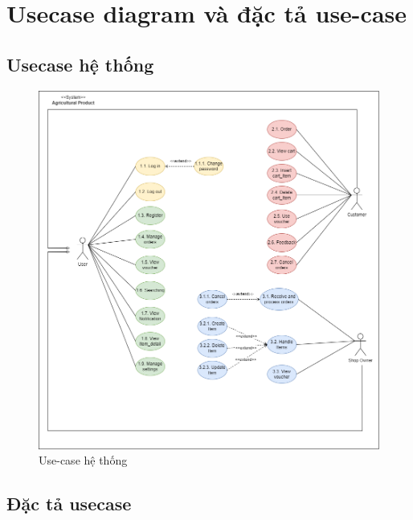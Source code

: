 \section{Usecase diagram và đặc tả use-case}
        \subsection{Usecase hệ thống}
            \begin{figure}[H]
                \centering
                \includegraphics[width=\linewidth]{Images/usecase.png}
                \vspace{1em}
                \caption{Use-case hệ thống}
            \end{figure}
        \newpage
        \subsection{Đặc tả usecase}

